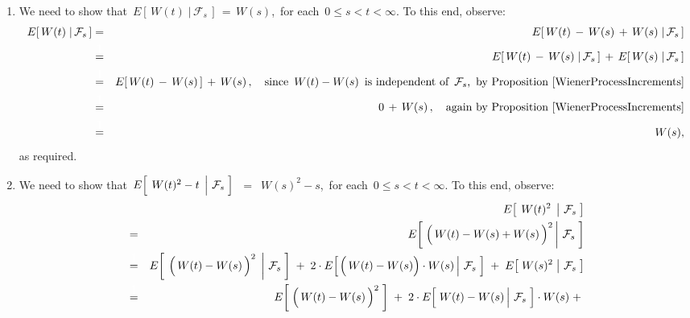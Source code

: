 \begin{enumerate}
\item
	We need to show that \,$E[\,W(t) \;\vert\, \mathcal{F}_{s}\,] \,=\, W(s)$,\,
	for each \,$0 \leq s < t < \infty$.
	To this end, observe:
	\begin{eqnarray*}
	E[\,W(t) \;\vert\, \mathcal{F}_{s}\,]
	& = &
		E[\, W(t) \,-\, W(s) \,+\, W(s) \;\vert\, \mathcal{F}_{s} \,]
	\\
	& \overset{{\color{white}\textnormal{\large$1$}}}{=} &
		E[\, W(t) \,-\, W(s) \;\vert\, \mathcal{F}_{s}\,] \,+\, E[\, W(s) \;\vert\, \mathcal{F}_{s} \,]
	\\
	& \overset{{\color{white}\textnormal{\large$1$}}}{=} &
		E[\, W(t) \,-\, W(s) \,] \,+\, W(s)\,,
		\quad
		\textnormal{since \,$W(t) - W(s)$\, is independent of \,$\mathcal{F}_{s}$,\, by Proposition \ref{WienerProcessIncrements}}
	\\
	& \overset{{\color{white}\textnormal{\large$1$}}}{=} &
		0 \,+\, W(s)\,,
		\quad
		\textnormal{again by Proposition \ref{WienerProcessIncrements}}
	\\
	& \overset{{\color{white}\textnormal{\large$1$}}}{=} &
		W(s),
	\end{eqnarray*}
	as required.
\item
	We need to show that
	\,$E\!\left[\;\left. W(t)^{2} \overset{{\color{white}.}}{-} t \,\;\right\vert\, \mathcal{F}_{s}\;\right]$
	\,$=$\,
	$W(s)^{2} - s $,\,
	for each \,$0 \leq s < t < \infty$.
	To this end, observe:
	\begin{eqnarray*}
	&&
		E\!\left[\;\left. W(t)^{2} \,\;\right\vert\, \mathcal{F}_{s}\;\right]
	\\
	& = &
		E\!\left[\,\left. \left(\,W(t) \overset{{\color{white}.}}{-} W(s) + W(s)\,\right)^{2} \,\right\vert\, \mathcal{F}_{s}\;\right]
	\\
	& \overset{{\color{white}\textnormal{\large$1$}}}{=} &
		E\!\left[\;\left. \left(\,W(t) \overset{{\color{white}.}}{-} W(s)\,\right)^{2} \,\;\right\vert\, \mathcal{F}_{s}\;\right]
		\; + \;
		2 \cdot E\!\left[\left. \left(\,W(t) \overset{{\color{white}.}}{-} W(s) \right) \cdot W(s) \,\right\vert\, \mathcal{F}_{s}\;\right]
		\; + \;
		E\!\left[\,\left. W(s)^{2} \;\right\vert\, \mathcal{F}_{s}\;\right]
	\\
	& \overset{{\color{white}\textnormal{\large$1$}}}{=} &
		E\!\left[\; \left(\,W(t) \overset{{\color{white}.}}{-} W(s)\,\right)^{2} \;\right]
		\; + \;
		2 \cdot E\!\left[\left.\, W(t) \overset{{\color{white}.}}{-} W(s) \,\right\vert\, \mathcal{F}_{s}\;\right] \cdot W(s)
		\; + \;

\end{eqnarray*}
\end{enumerate}
